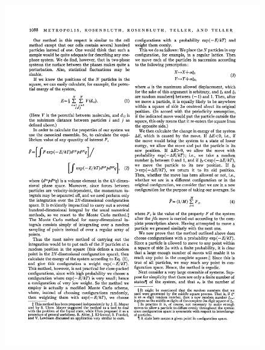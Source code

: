 \documentclass[hyperref={colorlinks=true}]{beamer}
\begin{document}
\begin{frame}
\begin{center}
\begin{minipage}{0.8\columnwidth}
\begin{framed}
\begin{figure}
    \includegraphics[width=\columnwidth]{MetropolisWeight2.pdf}
  \end{figure}
  \end{framed}
  \end{minipage}
  \end{center}
  
  \vspace{-0.2cm}
  

\end{frame}
\end{document}
